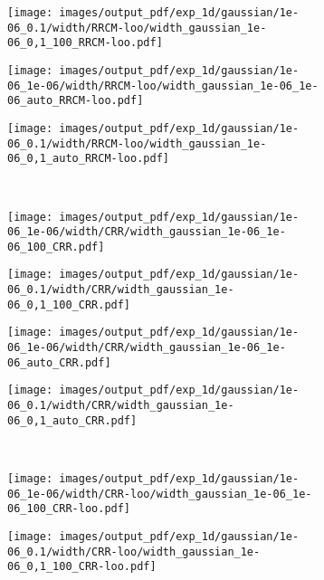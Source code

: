 \documentclass[a4paper,14pt]{extarticle}
\begin{document}
\begin{figure}
\begin{subfigure}[b]{0.25\linewidth}
  \end{subfigure}%
  \begin{subfigure}[b]{0.25\linewidth}
    \texttt{[image: images/output\_pdf/exp\_1d/gaussian/1e-06\_0.1/width/RRCM-loo/width\_gaussian\_1e-06\_0,1\_100\_RRCM-loo.pdf]}
  \end{subfigure}%
  \begin{subfigure}[b]{0.25\linewidth}
    \texttt{[image: images/output\_pdf/exp\_1d/gaussian/1e-06\_1e-06/width/RRCM-loo/width\_gaussian\_1e-06\_1e-06\_auto\_RRCM-loo.pdf]}
  \end{subfigure}%
  \begin{subfigure}[b]{0.25\linewidth}
    \texttt{[image: images/output\_pdf/exp\_1d/gaussian/1e-06\_0.1/width/RRCM-loo/width\_gaussian\_1e-06\_0,1\_auto\_RRCM-loo.pdf]}
  \end{subfigure}\\
  \begin{subfigure}[b]{0.25\linewidth}
    \texttt{[image: images/output\_pdf/exp\_1d/gaussian/1e-06\_1e-06/width/CRR/width\_gaussian\_1e-06\_1e-06\_100\_CRR.pdf]}
  \end{subfigure}%
  \begin{subfigure}[b]{0.25\linewidth}
    \texttt{[image: images/output\_pdf/exp\_1d/gaussian/1e-06\_0.1/width/CRR/width\_gaussian\_1e-06\_0,1\_100\_CRR.pdf]}
  \end{subfigure}%
  \begin{subfigure}[b]{0.25\linewidth}
    \texttt{[image: images/output\_pdf/exp\_1d/gaussian/1e-06\_1e-06/width/CRR/width\_gaussian\_1e-06\_1e-06\_auto\_CRR.pdf]}
  \end{subfigure}%
  \begin{subfigure}[b]{0.25\linewidth}
    \texttt{[image: images/output\_pdf/exp\_1d/gaussian/1e-06\_0.1/width/CRR/width\_gaussian\_1e-06\_0,1\_auto\_CRR.pdf]}
  \end{subfigure}\\
  \begin{subfigure}[b]{0.25\linewidth}
    \texttt{[image: images/output\_pdf/exp\_1d/gaussian/1e-06\_1e-06/width/CRR-loo/width\_gaussian\_1e-06\_1e-06\_100\_CRR-loo.pdf]}
    \caption{} \label{fig:gaussian_1d_low_noise_width_c1}
  \end{subfigure}%
  \begin{subfigure}[b]{0.25\linewidth}
    \texttt{[image: images/output\_pdf/exp\_1d/gaussian/1e-06\_0.1/width/CRR-loo/width\_gaussian\_1e-06\_0,1\_100\_CRR-loo.pdf]}

\end{subfigure}
\end{figure}
\end{document}
